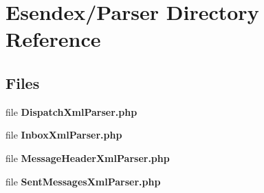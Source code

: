 \section{Esendex/\-Parser Directory Reference}
\label{dir_cc674dd88cfd4dd3f42347781147deb8}
\subsection*{Files}
\begin{DoxyCompactItemize}
\item 
file {\bfseries Dispatch\-Xml\-Parser.\-php}
\item 
file {\bfseries Inbox\-Xml\-Parser.\-php}
\item 
file {\bfseries Message\-Header\-Xml\-Parser.\-php}
\item 
file {\bfseries Sent\-Messages\-Xml\-Parser.\-php}
\end{DoxyCompactItemize}
